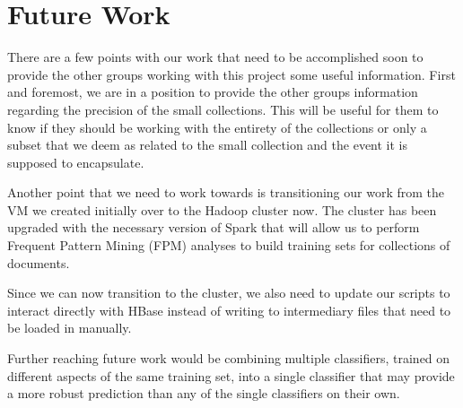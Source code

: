 \chapter{Future Work}\label{ch:futureWork}

There are a few points with our work that need to be accomplished soon to provide the other groups working with this project some useful information. First and foremost, we are in a position to provide the other groups information regarding the precision of the small collections. This will be useful for them to know if they should be working with the entirety of the collections or only a subset that we deem as related to the small collection and the event it is supposed to encapsulate.

Another point that we need to work towards is transitioning our work from the VM we created initially over to the Hadoop cluster now. The cluster has been upgraded with the necessary version of Spark that will allow us to perform Frequent Pattern Mining (FPM) analyses to build training sets for collections of documents.

Since we can now transition to the cluster, we also need to update our scripts to interact directly with HBase instead of writing to intermediary files that need to be loaded in manually.

Further reaching future work would be combining multiple classifiers, trained on different aspects of the same training set, into a single classifier that may provide a more robust prediction than any of the single classifiers on their own.







